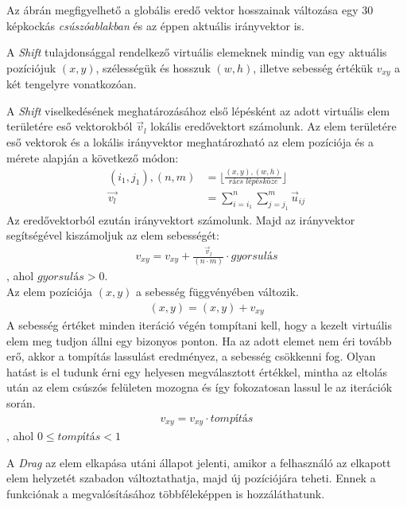 Az ábrán megfigyelhető a globális eredő vektor hosszainak változása egy 30 képkockás \textit{csúszóablakban} és az éppen aktuális irányvektor is.


A \textit{Shift} tulajdonsággal rendelkező virtuális elemeknek mindig van egy aktuális pozíciójuk $(x,y)$, szélességük és hosszuk $(w,h)$, illetve sebesség értékük $v_{xy}$ a két tengelyre vonatkozóan.

A \textit{Shift} viselkedésének meghatározásához első lépésként az adott virtuális elem területére eső vektorokból $\vec{v}_l$  lokális eredővektort számolunk. Az elem területére eső vektorok és a lokális irányvektor meghatározható az elem pozíciója és a mérete alapján a következő módon:
\begin{align*}
  (i_1, j_1), (n, m) &= \lfloor \frac{(x,y),(w,h)}{\textit{rács lépésköze}} \rfloor\\
  \vec{v_l} &= \sum_{i=i_1}^n \sum_{j=j_1}^m \vec{u}_{ij}
\end{align*}
Az eredővektorból ezután irányvektort számolunk. Majd az irányvektor segítségével kiszámoljuk az elem sebességét:
\begin{align*}
  v_{xy} = v_{xy} + \frac{\vec{v}_l}{(n \cdot m)} \cdot \textit{gyorsulás}
\end{align*}
, ahol $\textit{gyorsulás} > 0$.\\
Az elem pozíciója $(x,y)$ a sebesség függvényében változik.
\begin{align*}
  (x,y) = (x,y)+v_{xy}
\end{align*}
A sebesség értéket minden iteráció végén tompítani kell, hogy a kezelt virtuális elem meg tudjon állni egy bizonyos ponton. Ha az adott elemet nem éri tovább erő, akkor a tompítás lassulást eredményez, a sebesség csökkenni fog. Olyan hatást is el tudunk érni egy helyesen megválasztott értékkel, mintha az eltolás után az elem csúszós felületen mozogna és így fokozatosan lassul le az iterációk során.
\begin{align*}
  v_{xy} = v_{xy} \cdot \textit{tompítás}
\end{align*}
, ahol $0 \leq \textit{tompítás} < 1$



A \textit{Drag} az elem elkapása utáni állapot jelenti, amikor a felhasználó az elkapott elem helyzetét szabadon változtathatja, majd új pozíciójára teheti. Ennek a funkciónak a megvalósításához többféleképpen is hozzáláthatunk.

